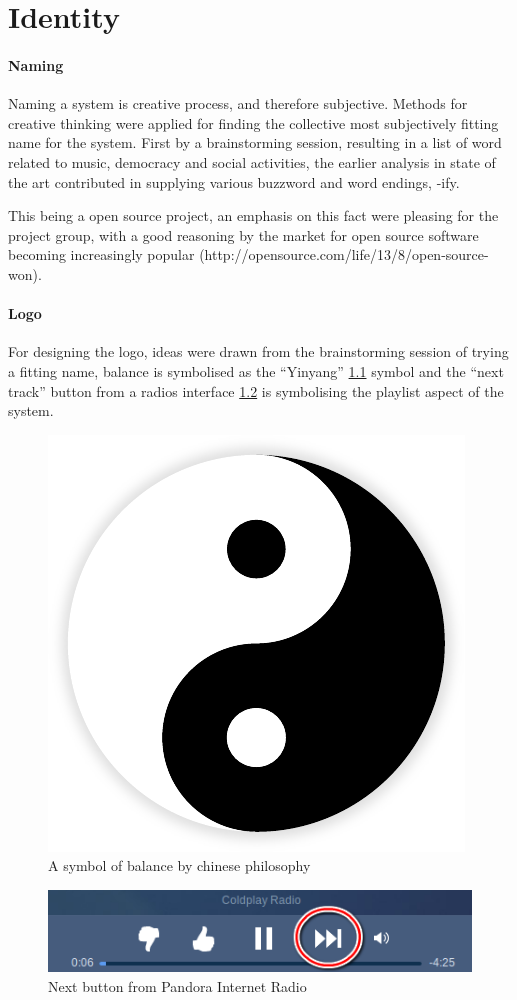 \chapter{Identity}
\label{appendix:identity}
\subsubsection{Naming}
Naming a system is creative process, and therefore subjective. Methods for creative thinking were applied for finding the collective most subjectively fitting name for the system. First by a brainstorming session, resulting in a list of word related to music, democracy and social activities, the earlier analysis in state of the art contributed in supplying various buzzword and word endings, -ify.

This being a open source project, an emphasis on this fact were pleasing for the project group, with a good reasoning by the market for open source software becoming increasingly popular (http://opensource.com/life/13/8/open-source-won).

\subsubsection{Logo}
For designing the logo, ideas were drawn from the brainstorming session of trying a fitting name, balance is symbolised as the \enquote{Yinyang} \cref{fig:yinyang} symbol and the \enquote{next track} button from a radios interface \cref{fig:vlc} is symbolising the playlist aspect of the system.

\begin{figure}
  \centering
  \includegraphics[width=0.2\linewidth]{Images/Yin-Yang}
  \caption{A symbol of balance by chinese philosophy~\cite{yinyangsource} }
  \label{fig:yinyang}
\end{figure}

\begin{figure}
  \centering
  \includegraphics[scale=0.7]{Images/pandoraNext.png}
  \caption{Next button from Pandora Internet Radio}
  \label{fig:vlc}
\end{figure}

